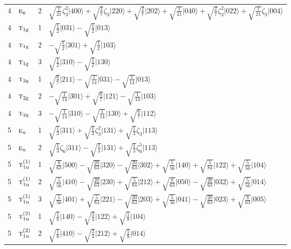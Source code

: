 \documentclass[11pt]{article}
\newcommand{\irr}[1]{\text{\normalfont\scshape #1}}
\newcommand{\ptag}[1]{\mathrm{#1}}
\newcommand{\rootunity}[1]{\zeta_{#1}}
\newcommand{\occ}[1]{\lvert #1\rangle}
\begin{document}
\begin{longtable}{c l c p{}}
4 & $\irr{e}_{\ptag{g}}$ & 2 & $\sqrt{\tfrac{1}{21}}\rootunity{3}^{2}\occ{400}+\sqrt{\tfrac{2}{7}}\rootunity{3}\occ{220}+\sqrt{\tfrac{2}{7}}\occ{202}+\sqrt{\tfrac{1}{21}}\occ{040}+\sqrt{\tfrac{2}{7}}\rootunity{3}^{2}\occ{022}+\sqrt{\tfrac{1}{21}}\rootunity{3}\occ{004}$\\
4 & $\irr{t}_{1\ptag{g}}$ & 1 & $\sqrt{\tfrac{1}{2}}\occ{031}-\sqrt{\tfrac{1}{2}}\occ{013}$\\
4 & $\irr{t}_{1\ptag{g}}$ & 2 & $-\sqrt{\tfrac{1}{2}}\occ{301}+\sqrt{\tfrac{1}{2}}\occ{103}$\\
4 & $\irr{t}_{1\ptag{g}}$ & 3 & $\sqrt{\tfrac{1}{2}}\occ{310}-\sqrt{\tfrac{1}{2}}\occ{130}$\\
4 & $\irr{t}_{2\ptag{g}}$ & 1 & $\sqrt{\tfrac{6}{7}}\occ{211}-\sqrt{\tfrac{1}{14}}\occ{031}-\sqrt{\tfrac{1}{14}}\occ{013}$\\
4 & $\irr{t}_{2\ptag{g}}$ & 2 & $-\sqrt{\tfrac{1}{14}}\occ{301}+\sqrt{\tfrac{6}{7}}\occ{121}-\sqrt{\tfrac{1}{14}}\occ{103}$\\
4 & $\irr{t}_{2\ptag{g}}$ & 3 & $-\sqrt{\tfrac{1}{14}}\occ{310}-\sqrt{\tfrac{1}{14}}\occ{130}+\sqrt{\tfrac{6}{7}}\occ{112}$\\
\hline
5 & $\irr{e}_{\ptag{u}}$ & 1 & $\sqrt{\tfrac{1}{3}}\occ{311}+\sqrt{\tfrac{1}{3}}\rootunity{3}^{2}\occ{131}+\sqrt{\tfrac{1}{3}}\rootunity{3}\occ{113}$\\
5 & $\irr{e}_{\ptag{u}}$ & 2 & $\sqrt{\tfrac{1}{3}}\rootunity{6}\occ{311}-\sqrt{\tfrac{1}{3}}\occ{131}+\sqrt{\tfrac{1}{3}}\rootunity{6}^{5}\occ{113}$\\
5 & $\irr{t}_{1\ptag{u}}^{(1)}$ & 1 & $\sqrt{\tfrac{8}{63}}\occ{500}-\sqrt{\tfrac{20}{63}}\occ{320}-\sqrt{\tfrac{20}{63}}\occ{302}+\sqrt{\tfrac{5}{56}}\occ{140}+\sqrt{\tfrac{5}{84}}\occ{122}+\sqrt{\tfrac{5}{56}}\occ{104}$\\
5 & $\irr{t}_{1\ptag{u}}^{(1)}$ & 2 & $\sqrt{\tfrac{5}{56}}\occ{410}-\sqrt{\tfrac{20}{63}}\occ{230}+\sqrt{\tfrac{5}{84}}\occ{212}+\sqrt{\tfrac{8}{63}}\occ{050}-\sqrt{\tfrac{20}{63}}\occ{032}+\sqrt{\tfrac{5}{56}}\occ{014}$\\
5 & $\irr{t}_{1\ptag{u}}^{(1)}$ & 3 & $\sqrt{\tfrac{5}{56}}\occ{401}+\sqrt{\tfrac{5}{84}}\occ{221}-\sqrt{\tfrac{20}{63}}\occ{203}+\sqrt{\tfrac{5}{56}}\occ{041}-\sqrt{\tfrac{20}{63}}\occ{023}+\sqrt{\tfrac{8}{63}}\occ{005}$\\
5 & $\irr{t}_{1\ptag{u}}^{(2)}$ & 1 & $\sqrt{\tfrac{1}{8}}\occ{140}-\sqrt{\tfrac{3}{4}}\occ{122}+\sqrt{\tfrac{1}{8}}\occ{104}$\\
5 & $\irr{t}_{1\ptag{u}}^{(2)}$ & 2 & $\sqrt{\tfrac{1}{8}}\occ{410}-\sqrt{\tfrac{3}{4}}\occ{212}+\sqrt{\tfrac{1}{8}}\occ{014}$\\

\end{longtable}
\end{document}
